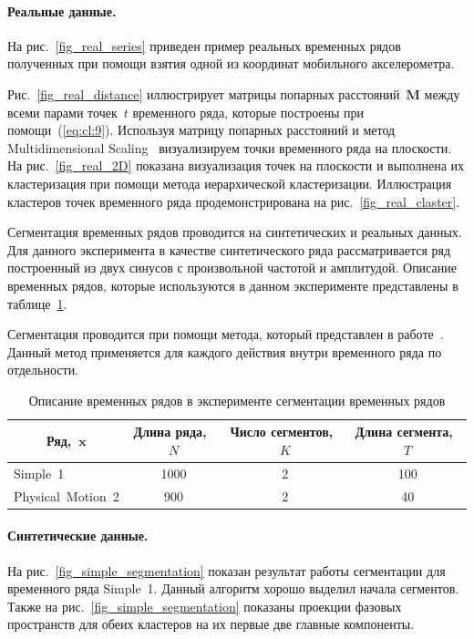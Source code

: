\paragraph{Реальные данные.}

На рис.~\ref{fig_real_series} приведен пример реальных временных рядов полученных при помощи взятия одной из координат мобильного акселерометра. 

Рис.~\ref{fig_real_distance} иллюстрирует матрицы попарных расстояний~$\textbf{M}$ между всеми парами точек~$t$ временного ряда, которые построены при помощи~(\ref{eq:cl:9}). 
Используя матрицу попарных расстояний и метод Multidimensional Scaling~\cite{Borg2005} визуализируем точки временного ряда на плоскости. 
На рис.~\ref{fig_real_2D} показана визуализация точек на плоскости и выполнена их кластеризация при помощи метода иерархической кластеризации. 
Иллюстрация кластеров точек временного ряда продемонстрирована на рис.~\ref{fig_real_claster}.

Сегментация временных рядов проводится на синтетических и реальных данных. Для данного эксперимента в качестве синтетического ряда рассматривается ряд построенный из двух синусов с произвольной частотой и амплитудой. Описание временных рядов, которые используются в данном эксперименте представлены в таблице~\ref{table:3}.

Сегментация проводится при помощи метода, который представлен в работе~\cite{motrenko2015}. Данный метод применяется для каждого действия внутри временного ряда по отдельности.


\begin{table}[h!t]
\begin{center}
\caption{Описание временных рядов в эксперименте сегментации временных рядов}
\label{table:3}
\begin{tabular}{|c|c|c|c|}
\hline
	Ряд,~$\textbf{x}$ &Длина ряда,~$N$& Число сегментов,~$K$&Длина сегмента,~$T$\\
	\hline
	\multicolumn{1}{|l|}{Simple~1}
	& 1000& 2& 100\\
	\hline
	\multicolumn{1}{|l|}{Physical~Motion~2}
	& 900& 2& 40\\
\hline

\end{tabular}
\end{center}
\end{table}

\paragraph{Синтетические данные.} На рис.~\ref{fig_simple_segmentation} показан результат работы сегментации для временного ряда Simple~1. 
Данный алгоритм хорошо выделил начала сегментов. 
Также на рис.~\ref{fig_simple_segmentation} показаны проекции фазовых пространств для обеих кластеров на их первые две главные компоненты.

